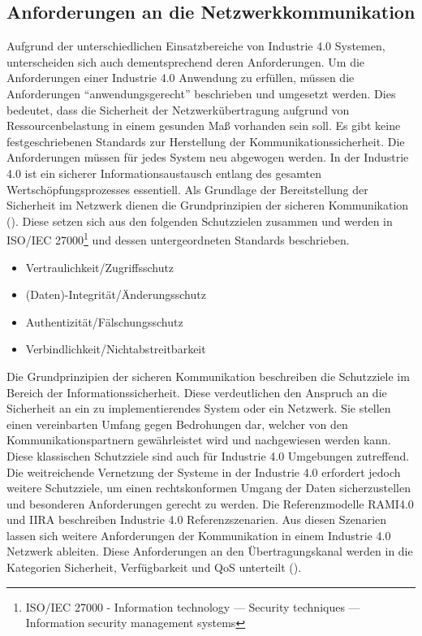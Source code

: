 \subsection{Anforderungen an die Netzwerkkommunikation}
\label{Grundlagen:Anforderungen}
Aufgrund der unterschiedlichen Einsatzbereiche von Industrie 4.0 Systemen, unterscheiden sich auch dementsprechend deren Anforderungen. Um die Anforderungen einer Industrie 4.0 Anwendung zu erfüllen, müssen die Anforderungen "`anwendungsgerecht"' beschrieben und umgesetzt werden. Dies bedeutet, dass die Sicherheit der Netzwerkübertragung aufgrund von Ressourcenbelastung in einem gesunden Maß vorhanden sein soll. Es gibt keine festgeschriebenen Standards zur Herstellung der Kommunikationssicherheit. Die Anforderungen müssen für jedes System neu abgewogen werden. In der Industrie 4.0 ist ein sicherer Informationsaustausch entlang des gesamten Wertschöpfungsprozesses essentiell. Als Grundlage der Bereitstellung der Sicherheit im Netzwerk dienen die Grundprinzipien der sicheren Kommunikation (\cite{Schleupner2016}). Diese setzen sich aus den folgenden Schutzzielen zusammen und werden in \ac{ISO}/\ac{IEC} 27000\footnote{ISO/IEC 27000 - Information technology — Security techniques — Information security management systems} und dessen untergeordneten Standards beschrieben.

\begin{itemize}
  \item Vertraulichkeit/Zugriffsschutz
  \item (Daten)-Integrität/Änderungsschutz
  \item Authentizität/Fälschungsschutz
  \item Verbindlichkeit/Nichtabstreitbarkeit
\end{itemize}

Die Grundprinzipien der sicheren Kommunikation beschreiben die Schutzziele im Bereich der Informationssicherheit. Diese verdeutlichen den Anspruch an die Sicherheit an ein zu implementierendes System oder ein Netzwerk. Sie stellen einen vereinbarten Umfang gegen Bedrohungen dar, welcher von den Kommunikationspartnern gewährleistet wird und nachgewiesen werden kann. Diese klassischen Schutzziele sind auch für Industrie 4.0 Umgebungen zutreffend. Die weitreichende Vernetzung der Systeme in der Industrie 4.0 erfordert jedoch weitere Schutzziele, um einen rechtskonformen Umgang der Daten sicherzustellen und besonderen Anforderungen gerecht zu werden. Die Referenzmodelle \ac{RAMI4.0} und \ac{IIRA} beschreiben Industrie 4.0 Referenzszenarien. Aus diesen Szenarien lassen sich weitere Anforderungen der Kommunikation in einem Industrie 4.0 Netzwerk ableiten. Diese Anforderungen an den Übertragungskanal werden in die Kategorien Sicherheit, Verfügbarkeit und \ac{QoS} unterteilt (\cite{BMWiNeCon2016}).

